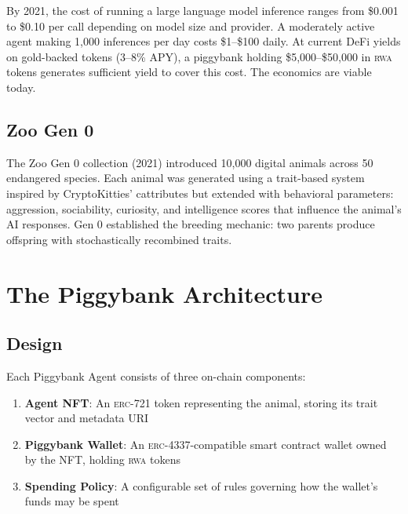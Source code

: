 \documentclass[11pt,letterpaper]{article}
\newcommand{\ERC}{\textsc{erc}}
\newcommand{\RWA}{\textsc{rwa}}
\begin{document}
By 2021, the cost of running a large language model inference ranges from \$0.001 to \$0.10 per call depending on model size and provider. A moderately active agent making 1,000 inferences per day costs \$1--\$100 daily. At current DeFi yields on gold-backed tokens (3--8\% APY), a piggybank holding \$5,000--\$50,000 in \RWA{} tokens generates sufficient yield to cover this cost. The economics are viable today.

\subsection{Zoo Gen 0}

The Zoo Gen 0 collection (2021) introduced 10,000 digital animals across 50 endangered species. Each animal was generated using a trait-based system inspired by CryptoKitties' cattributes but extended with behavioral parameters: aggression, sociability, curiosity, and intelligence scores that influence the animal's AI responses. Gen 0 established the breeding mechanic: two parents produce offspring with stochastically recombined traits.

\section{The Piggybank Architecture}
\label{sec:piggybank}

\subsection{Design}

Each Piggybank Agent consists of three on-chain components:

\begin{enumerate}
    \item \textbf{Agent NFT}: An \ERC{}-721 token representing the animal, storing its trait vector and metadata URI
    \item \textbf{Piggybank Wallet}: An \ERC{}-4337-compatible smart contract wallet owned by the NFT, holding \RWA{} tokens
    \item \textbf{Spending Policy}: A configurable set of rules governing how the wallet's funds may be spent
\end{enumerate}
\end{document}
